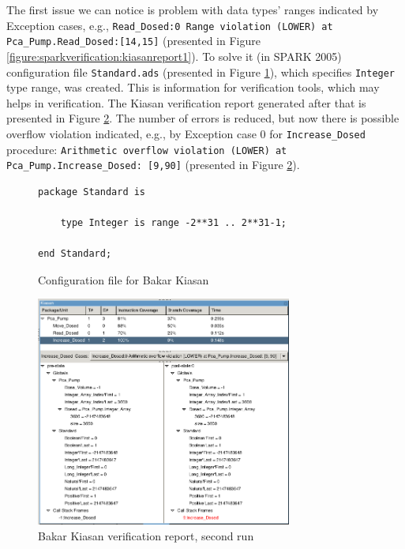 The first issue we can notice is problem with data types' ranges indicated by Exception cases, e.g., \lstinline{Read_Dosed:0 Range violation (LOWER) at Pca_Pump.Read_Dosed:[14,15]} (presented in Figure \ref{figure:sparkverification:kiasanreport1}). To solve it (in SPARK 2005) configuration file \lstinline{Standard.ads} (presented in Figure \ref{figure:sparkverification:config}), which specifies \lstinline{Integer} type range, was created. This is information for verification tools, which may helps in verification. The Kiasan verification report generated after that is presented in Figure \ref{figure:sparkverification:kiasanreport2}. The number of errors is reduced, but now there is possible overflow violation indicated, e.g., by Exception case 0 for \lstinline{Increase_Dosed} procedure: \lstinline{Arithmetic overflow violation (LOWER) at Pca_Pump.Increase_Dosed: [9,90]} (presented in Figure \ref{figure:sparkverification:kiasanreport2}).

\begin{figure}
\singlespacing
\begin{lstlisting}[frame=single, gobble=0]
package Standard is

    type Integer is range -2**31 .. 2**31-1;

end Standard;
\end{lstlisting}
\doublespacing
\caption{Configuration file for Bakar Kiasan}
\label{figure:sparkverification:config}
\end{figure}

\begin{figure}[ht]%
    \begin{center}
        \includegraphics[width=0.75\textwidth]{figures/pca-pump-verification-step2.png}        
    \end{center}
    \caption{Bakar Kiasan verification report, second run}
    \label{figure:sparkverification:kiasanreport2}
\end{figure}

